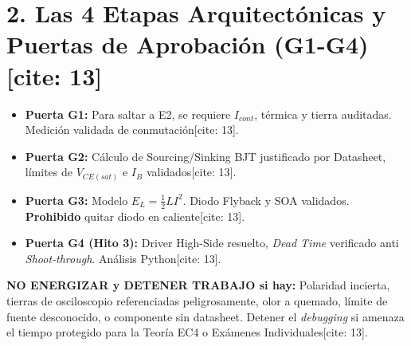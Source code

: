 \documentclass[11pt, a4paper]{article}
\begin{document}
\vspace{0.4cm}
\section*{2. Las 4 Etapas Arquitectónicas y Puertas de Aprobación (G1-G4)[cite: 13]}

\begin{center}
\end{center}

\begin{itemize}
    \setlength\itemsep{0.2em}
    \item \textbf{Puerta G1:} Para saltar a E2, se requiere $I_{cont}$, térmica y tierra auditadas. Medición validada de conmutación[cite: 13].
    \item \textbf{Puerta G2:} Cálculo de Sourcing/Sinking BJT justificado por Datasheet, límites de $V_{CE(sat)}$ e $I_B$ validados[cite: 13].
    \item \textbf{Puerta G3:} Modelo $E_L = \frac{1}{2} L I^2$. Diodo Flyback y SOA validados. \textbf{Prohibido} quitar diodo en caliente[cite: 13].
    \item \textbf{Puerta G4 (Hito 3):} Driver High-Side resuelto, \textit{Dead Time} verificado anti \textit{Shoot-through}. Análisis Python[cite: 13].
\end{itemize}

\vspace{0.4cm}
\begin{tcolorbox}[colback=red!5, colframe=red!70!black, title=\textbf{Reglas de Parada Oficial (Stop Rules)[cite: 13]}]
    \textbf{NO ENERGIZAR y DETENER TRABAJO si hay:} Polaridad incierta, tierras de osciloscopio referenciadas peligrosamente, olor a quemado, límite de fuente desconocido, o componente sin datasheet. Detener el \textit{debugging} si amenaza el tiempo protegido para la Teoría EC4 o Exámenes Individuales[cite: 13].
\end{tcolorbox}
\end{document}

